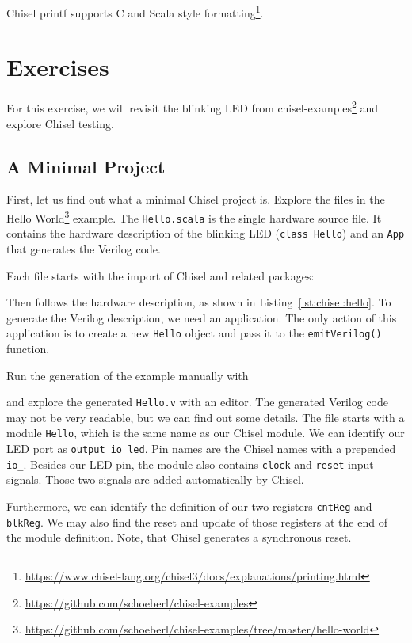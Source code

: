 \documentclass[%
    10pt,
    headinclude, footexclude,
    openright, %
    notitlepage,
    cleardoubleempty,
    headsepline,
    pointlessnumbers,
    bibtotoc, idxtotoc,
    ]{scrbook}
\newcommand{\code}[1]{{\small{\texttt{#1}}}}
\newcommand{\myref}[2]{\href{#1}{#2}}
\renewcommand{\myref}[2]{{#2}{\footnote{\url{#1}}}}
\begin{document}
Chisel printf supports
\myref{https://www.chisel-lang.org/chisel3/docs/explanations/printing.html}{C and Scala style formatting}.


\section{Exercises}

For this exercise, we will revisit the blinking LED from
\myref{https://github.com/schoeberl/chisel-examples}{chisel-examples}
and explore Chisel testing.

\subsection{A Minimal Project}

First, let us find out what a minimal Chisel project is. Explore the files in the
\myref{https://github.com/schoeberl/chisel-examples/tree/master/hello-world}{Hello World}
example.
The \code{Hello.scala} is the single hardware source file.
It contains the hardware description of the blinking LED (\code{class Hello})
and an \code{App} that generates the Verilog code.

Each file starts with the import of Chisel and related packages:


\noindent Then follows the hardware description, as shown in Listing~\ref{lst:chisel:hello}.
To generate the Verilog description, we need an application. 
The only action of this application is to create a new \code{Hello} object and pass it
to the \code{emitVerilog()} function.


\noindent Run the generation of the example manually with


and explore the generated \code{Hello.v} with an editor. The generated Verilog code may not be
very readable, but we can find out some details. The file starts with a module \code{Hello},
which is the same name as our Chisel module. We can identify our LED port as
\code{output io\_led}. Pin names are the Chisel names with a prepended \code{io\_}.
Besides our LED pin, the module also contains \code{clock} and \code{reset} input signals.
Those two signals are added automatically by Chisel.

Furthermore, we can identify the definition of our two registers \code{cntReg} and \code{blkReg}.
We may also find the reset and update of those registers at the end of the module definition.
Note, that Chisel generates a synchronous reset.
\end{document}

